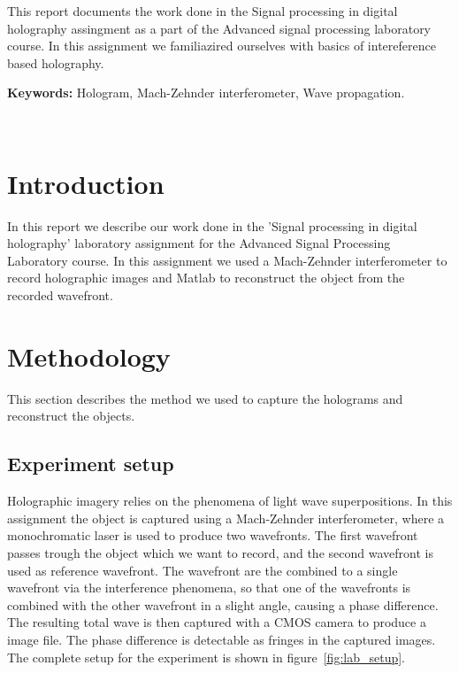 \documentclass[12pt,a4paper,english
]{tunithesis}
\begin{document}
\vspace{0.5cm}


\noindent
This report documents the work done in the Signal processing in digital holography assingment as a part of the Advanced signal processing laboratory course. In this assignment we familiazired ourselves with basics of intereference based holography.
~

\noindent\textbf{Keywords:} Hologram, Mach-Zehnder interferometer, Wave propagation.

~




\setcounter{tocdepth}{3}              %
\tableofcontents                      %


\if@twoside
\cleardoublepage
\fi


\renewcommand{\chaptername}{} %


\chapter{Introduction}
\label{ch:intro}
In this report we describe our work done in the 'Signal processing in digital holography' laboratory assignment for the Advanced Signal Processing Laboratory course. In this assignment we used a Mach-Zehnder interferometer to record holographic images and Matlab to reconstruct the object from the recorded wavefront.

\setcounter{page}{1} 

\chapter{Methodology}
This section describes the method we used to capture the holograms and reconstruct the objects.
\label{sec:methodology}
\section{Experiment setup}
Holographic imagery relies on the phenomena of light wave superpositions. In this assignment the object is captured using a Mach-Zehnder interferometer, where a monochromatic laser is used to produce two wavefronts. The first wavefront passes trough the object which we want to record, and the second wavefront is used as reference wavefront. The wavefront are the combined to a single wavefront via the interference phenomena, so that one of the wavefronts is combined with the other wavefront in a slight angle, causing a phase difference. The resulting total wave is then captured with a CMOS camera to produce a image file. The phase difference is detectable as fringes in the captured images. The complete setup for the experiment is shown in figure~\ref{fig:lab_setup}.
\end{document}
